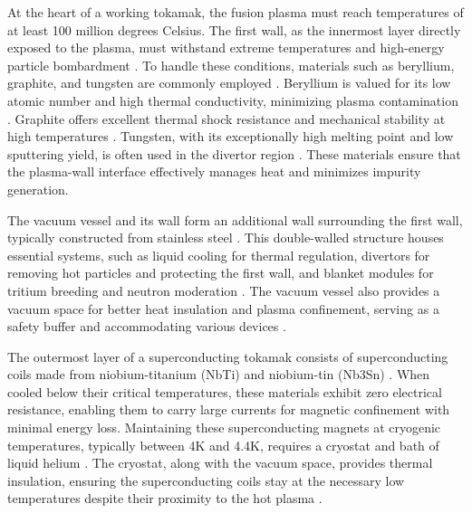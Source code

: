 At the heart of a working tokamak, the fusion plasma must reach temperatures of at least 100 million degrees Celsius. The first wall, as the innermost layer directly exposed to the plasma, must withstand extreme temperatures and high-energy particle bombardment \cite{abdou2015blanket}. To handle these conditions, materials such as beryllium, graphite, and tungsten are commonly employed \cite{wesson2011tokamaks,federici2001plasma,wilson1990beryllium,philipps2011tungsten}. Beryllium is valued for its low atomic number and high thermal conductivity, minimizing plasma contamination \cite{federici2001plasma,wilson1990beryllium}. Graphite offers excellent thermal shock resistance and mechanical stability at high temperatures \cite{federici2001plasma,wilson1990beryllium,philipps2011tungsten}. Tungsten, with its exceptionally high melting point and low sputtering yield, is often used in the divertor region \cite{wesson2011tokamaks,federici2001plasma,wilson1990beryllium,philipps2011tungsten}. These materials ensure that the plasma-wall interface effectively manages heat and minimizes impurity generation.

The vacuum vessel and its wall form an additional wall surrounding the first wall, typically constructed from stainless steel \cite{wesson2011tokamaks,federici2001plasma,iter_website,abdou2015blanket}. This double-walled structure houses essential systems, such as liquid cooling for thermal regulation, divertors for removing hot particles and protecting the first wall, and blanket modules for tritium breeding and neutron moderation \cite{abdou2015blanket}. The vacuum vessel also provides a vacuum space for better heat insulation and plasma confinement, serving as a safety buffer and accommodating various devices \cite{wesson2011tokamaks}.

The outermost layer of a superconducting tokamak consists of superconducting coils made from niobium-titanium (NbTi) and niobium-tin (Nb3Sn) \cite{wesson2011tokamaks, pong2012worldwide}. When cooled below their critical temperatures, these materials exhibit zero electrical resistance, enabling them to carry large currents for magnetic confinement with minimal energy loss. Maintaining these superconducting magnets at cryogenic temperatures, typically between 4K and 4.4K, requires a cryostat and bath of liquid helium \cite{pong2012worldwide, wesson2011tokamaks}. The cryostat, along with the vacuum space, provides thermal insulation, ensuring the superconducting coils stay at the necessary low temperatures despite their proximity to the hot plasma \cite{doshi2011iter, pong2012worldwide}.

